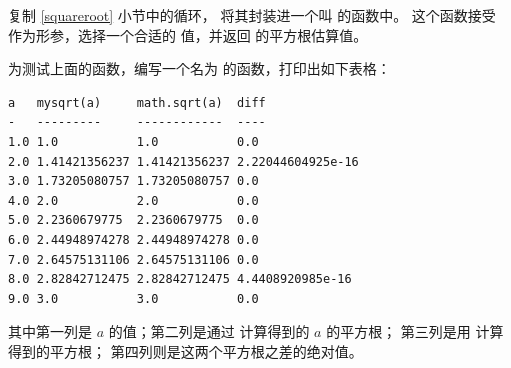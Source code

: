 \begin{exercise}


复制 \ref{squareroot} 小节中的循环， 将其封装进一个叫 {\em {}} 的函数中。 这个函数接受 {\em {}} 作为形参，选择一个合适的 {\em {}} 值，并返回 {\em {}} 的平方根估算值。


为测试上面的函数，编写一个名为 {\em {}} 的函数，打印出如下表格：

\begin{em}
\begin{lstlisting}
a   mysqrt(a)     math.sqrt(a)  diff
-   ---------     ------------  ----
1.0 1.0           1.0           0.0
2.0 1.41421356237 1.41421356237 2.22044604925e-16
3.0 1.73205080757 1.73205080757 0.0
4.0 2.0           2.0           0.0
5.0 2.2360679775  2.2360679775  0.0
6.0 2.44948974278 2.44948974278 0.0
7.0 2.64575131106 2.64575131106 0.0
8.0 2.82842712475 2.82842712475 4.4408920985e-16
9.0 3.0           3.0           0.0
\end{lstlisting}
\end{em}

%

其中第一列是 $a$ 的值；第二列是通过 {\em {}} 计算得到的 $a$ 的平方根； 第三列是用 {\em {}} 计算得到的平方根； 第四列则是这两个平方根之差的绝对值。

\end{exercise}


